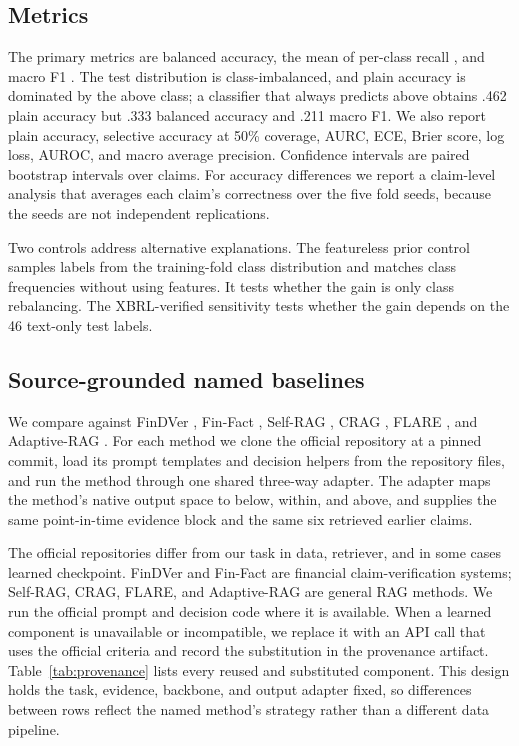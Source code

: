 \documentclass[11pt]{article}
\begin{document}
\subsection{Metrics}
The primary metrics are balanced accuracy, the mean of per-class recall \citep{brodersen2010balanced}, and macro F1 \citep{sokolova2009performance}. The test distribution is class-imbalanced, and plain accuracy is dominated by the above class; a classifier that always predicts above obtains .462 plain accuracy but .333 balanced accuracy and .211 macro F1. We also report plain accuracy, selective accuracy at 50\% coverage, AURC, ECE, Brier score, log loss, AUROC, and macro average precision. Confidence intervals are paired bootstrap intervals over claims. For accuracy differences we report a claim-level analysis that averages each claim's correctness over the five fold seeds, because the seeds are not independent replications.

Two controls address alternative explanations. The featureless prior control samples labels from the training-fold class distribution and matches class frequencies without using features. It tests whether the gain is only class rebalancing. The XBRL-verified sensitivity tests whether the gain depends on the 46 text-only test labels.

\subsection{Source-grounded named baselines}
We compare against FinDVer \citep{zhao2024findver}, Fin-Fact \citep{rangapur2025finfact}, Self-RAG \citep{asai2024selfrag}, CRAG \citep{yan2024crag}, FLARE \citep{jiang2023flare}, and Adaptive-RAG \citep{jeong2024adaptiverag}. For each method we clone the official repository at a pinned commit, load its prompt templates and decision helpers from the repository files, and run the method through one shared three-way adapter. The adapter maps the method's native output space to below, within, and above, and supplies the same point-in-time evidence block and the same six retrieved earlier claims.

The official repositories differ from our task in data, retriever, and in some cases learned checkpoint. FinDVer and Fin-Fact are financial claim-verification systems; Self-RAG, CRAG, FLARE, and Adaptive-RAG are general RAG methods. We run the official prompt and decision code where it is available. When a learned component is unavailable or incompatible, we replace it with an API call that uses the official criteria and record the substitution in the provenance artifact. Table~\ref{tab:provenance} lists every reused and substituted component. This design holds the task, evidence, backbone, and output adapter fixed, so differences between rows reflect the named method's strategy rather than a different data pipeline.
\end{document}
